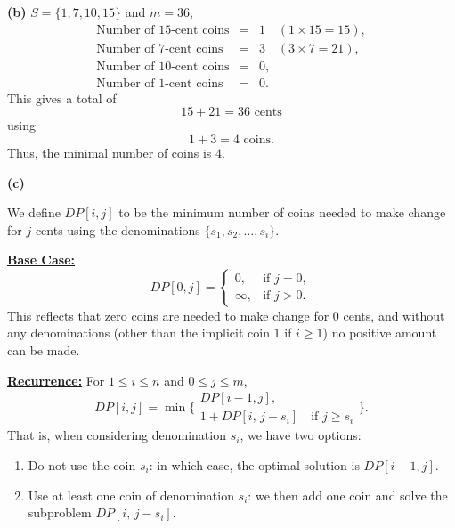 \documentclass[11pt]{article}
\begin{document}
    \medskip
    
    \textbf{(b)} \(S=\{1, 7, 10, 15\}\) and \(m=36\),
    \[
    \begin{array}{rcl}
    \text{Number of 15-cent coins} &=& 1 \quad (1\times15=15),\\[1mm]
    \text{Number of 7-cent coins}  &=& 3 \quad (3\times7=21),\\[1mm]
    \text{Number of 10-cent coins} &=& 0,\\[1mm]
    \text{Number of 1-cent coins}  &=& 0.
    \end{array}
    \]
    This gives a total of 
    \[
    15+21=36 \text{ cents}
    \]
    using 
    \[
    1+3=4 \text{ coins}.
    \]
    Thus, the minimal number of coins is \(\boxed{4}\).
    
    \medskip
    
    \textbf{(c)}
    
    We define \(DP[i,j]\) to be the minimum number of coins needed to make change for \(j\) cents using the denominations \(\{s_1, s_2, \dots, s_i\}\).
    
    \medskip
    
    \underline{\textbf{Base Case:}}
    \[
    DP[0,j]=
    \begin{cases}
    0, & \text{if } j=0,\\[1mm]
    \infty, & \text{if } j>0.
    \end{cases}
    \]
    This reflects that zero coins are needed to make change for 0 cents, and without any denominations (other than the implicit coin \(1\) if \(i\ge 1\)) no positive amount can be made.
    
    \medskip
    
    \underline{\textbf{Recurrence:}}
    For \(1\le i\le n\) and \(0\le j\le m\),
    \[
    DP[i,j] = \min \Biggl\{
    \begin{array}{l}
    DP[i-1,j],\\[1mm]
    1 + DP[i,\, j-s_i] \quad \text{if } j\ge s_i
    \end{array}
    \Biggr\}.
    \]
    That is, when considering denomination \(s_i\), we have two options:
    \begin{enumerate}
        \item Do not use the coin \(s_i\): in which case, the optimal solution is \(DP[i-1,j]\).
        \item Use at least one coin of denomination \(s_i\): we then add one coin and solve the subproblem \(DP[i,\, j-s_i]\).
    \end{enumerate}
    
\end{document}

